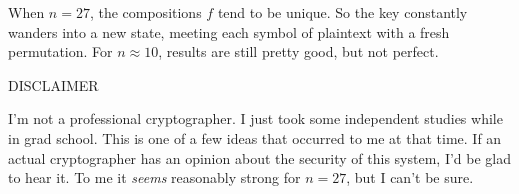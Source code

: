 \documentclass{article}
\renewcommand{\i}{\textit}
\begin{document}
{{When $n = 27$, the compositions $f$ tend to be unique. So the key constantly wanders into a new state, meeting each symbol of plaintext with a fresh permutation. For $n \approx 10$, results are still pretty good, but not perfect. 

DISCLAIMER

I'm not a professional cryptographer. I just took some independent studies while in grad school. This is one of a few ideas that occurred to me at that time. If an actual cryptographer has an opinion about the security of this system, I'd be glad to hear it. To me it \i{seems} reasonably strong for $n = 27$, but I can't be sure. 

}}
\end{document}
